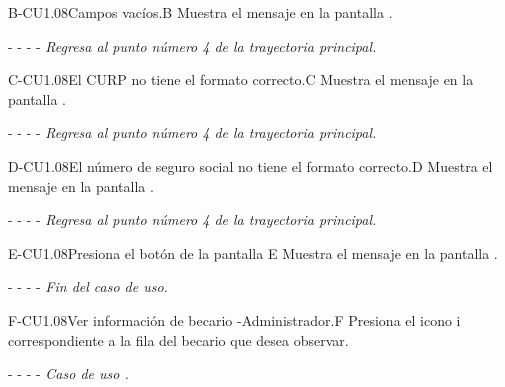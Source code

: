 	\begin{UCtrayectoriaA}{B-CU1.08}{Campos vacíos.}{B}
	    \UCpaso[\UCsist]Muestra el mensaje en la pantalla .
	    \item[- -] - - {\em Regresa al punto número 4 de la trayectoria principal.}
	\end{UCtrayectoriaA}

    
	\begin{UCtrayectoriaA}{C-CU1.08}{El CURP no tiene el formato correcto.}{C}
			\UCpaso[\UCsist] Muestra el mensaje  en la pantalla .
			\item[- -] - - {\em Regresa al punto número 4 de la trayectoria principal.} 
    \end{UCtrayectoriaA}

	\begin{UCtrayectoriaA}{D-CU1.08}{El número de seguro social no tiene el formato correcto.}{D}
			\UCpaso[\UCsist] Muestra el mensaje  en la pantalla .
			\item[- -] - - {\em Regresa al punto número 4 de la trayectoria principal.} 
    \end{UCtrayectoriaA}
    
	\begin{UCtrayectoriaA}{E-CU1.08}{Presiona el botón  de la pantalla }{E}
		\UCpaso[\UCsist] Muestra el mensaje  en la pantalla .
		\item[- -] - - {\em Fin del caso de uso.} 
	\end{UCtrayectoriaA}
    
  \begin{UCtrayectoriaA}{F-CU1.08}{Ver información de becario -Administrador.}{F}
	     \UCpaso[\UCactor]Presiona el icono \textcircled{i} correspondiente a la fila del becario que desea observar.
	    \item[- -] - - {\em Caso de uso .}
	\end{UCtrayectoriaA}
	
